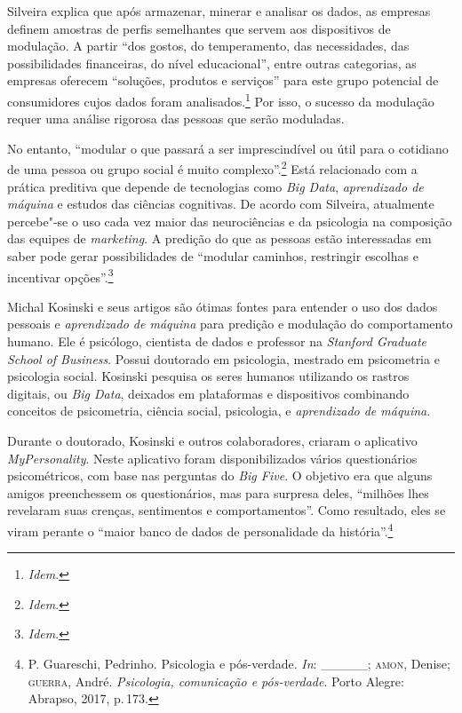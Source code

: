 Silveira explica que após armazenar, minerar e analisar os dados,
as empresas definem amostras de perfis semelhantes que servem aos
dispositivos de modulação. A partir ``dos gostos, do temperamento, das
necessidades, das possibilidades financeiras, do nível educacional'',
entre outras categorias, as empresas oferecem ``soluções, produtos e
serviços'' para este grupo potencial de consumidores cujos dados foram
analisados.\footnote{\textit{Idem}.} Por isso, o sucesso da modulação requer uma
análise rigorosa das pessoas que serão moduladas.

No entanto, ``modular o que passará a ser imprescindível ou útil para o
cotidiano de uma pessoa ou grupo social é muito complexo''.\footnote{\textit{Idem}.} Está relacionado com a prática preditiva que depende
de tecnologias como \textit{Big Data}, \textit{aprendizado de máquina} e estudos
das ciências cognitivas. De acordo com Silveira, atualmente percebe"-se
o uso cada vez maior das neurociências e da psicologia na composição das
equipes de \textit{marketing}. A predição do que as pessoas estão interessadas em
saber pode gerar possibilidades de ``modular caminhos, restringir
escolhas e incentivar opções''.\footnote{\textit{Idem}.}

Michal Kosinski e seus artigos são ótimas fontes para entender o uso dos
dados pessoais e \textit{aprendizado de máquina} para predição e modulação do
comportamento humano. Ele é psicólogo, cientista de dados e professor na
\textit{Stanford Graduate School of Business}. Possui doutorado em
psicologia, mestrado em psicometria e psicologia social. Kosinski
pesquisa os seres humanos utilizando os rastros digitais, ou \textit{Big
Data}, deixados em plataformas e dispositivos combinando conceitos de
psicometria, ciência social, psicologia, e \textit{aprendizado de máquina}.

Durante o doutorado, Kosinski e outros colaboradores, criaram o
aplicativo \textit{MyPersonality}. Neste aplicativo foram disponibilizados
vários questionários psicométricos, com base nas perguntas do \textit{Big
Five}. O objetivo era que alguns amigos preenchessem os questionários,
mas para surpresa deles, ``milhões lhes revelaram suas crenças,
sentimentos e comportamentos''. Como resultado, eles se viram perante o
``maior banco de dados de personalidade da história''.\footnote{P. Guareschi, Pedrinho. Psicologia e pós-verdade. \textit{In}:
\_\_\_\_\_; \textsc{amon}, Denise; \textsc{guerra}, André. \textit{Psicologia, comunicação e pós-verdade}. Porto Alegre: Abrapso, 2017, p.\,173.}

